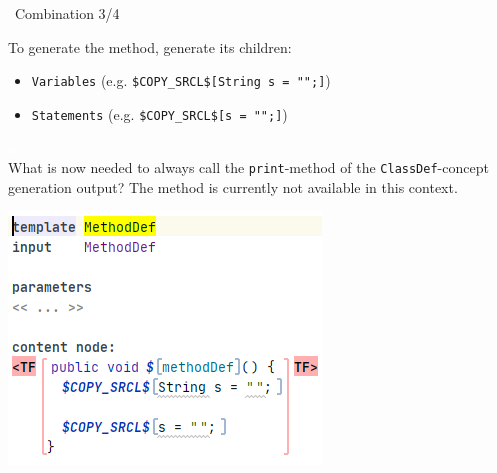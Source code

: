 	\begin{frame}{\workshoptemplate\ Combination 3/4}
	\begin{minipage}{0.52\textwidth}
		To generate the method, generate its children: \\
		\begin{itemize}
			\item \texttt{Variables} (e.g. \texttt{\$COPY\_SRCL\$[String s = "";]})
			\item \texttt{Statements} (e.g. \texttt{\$COPY\_SRCL\$[s = "";]})
		\end{itemize}
	
		\textcolor{white}{m}\\
		
		What is now needed to always call the \texttt{print}-method of the \texttt{ClassDef}-concept generation output? The method is currently not available in this context.
	\end{minipage}
	\begin{minipage}{0.4\textwidth}
		\includegraphics[height=0.8\textheight]{illustrations/methodDefGen.png}
	\end{minipage}
	\end{frame}

